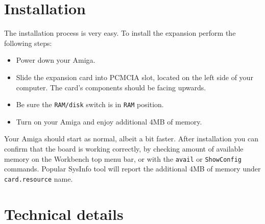 \documentclass[10pt,a4paper]{article}
\begin{document}
\section*{Installation}

The installation process is very easy. To install the expansion perform the following steps:

\begin{itemize}
	\item Power down your Amiga.
	\item Slide the expansion card into PCMCIA slot, located on the left side of your computer. The card's components should be facing upwards.
	\item Be sure the {\tt RAM/disk} switch is in {\tt RAM} position.
	\item Turn on your Amiga and enjoy additional 4MB of memory.
\end{itemize}

Your Amiga should start as normal, albeit a bit faster. After installation you can confirm that the board is working correctly, by checking amount of available memory on the Workbench top menu bar, or with the {\tt avail} or {\tt ShowConfig} commands. Popular SysInfo tool will report the additional 4MB of memory under {\tt card.resource} name.

\section*{Technical details}
\end{document}
